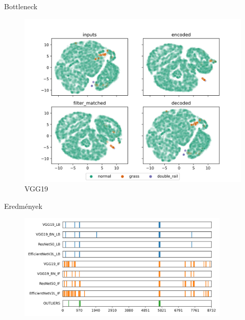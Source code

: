 \documentclass[aspectratio=169]{beamer}
\begin{document}
\begin{frame}{Bottleneck}
    \begin{figure}
        \centering
        \includegraphics[height=0.8\textheight,trim={0 0 0 1cm},clip]{./results/vgg19_vgg19/20230510_172958_feature_vectors_1.png}
        \caption*{VGG19}
    \end{figure}
\end{frame}

\begin{frame}{Eredmények}
    \begin{figure}
        \centering
        \includegraphics[width=0.9\textwidth]{./results/comparison/outlier_comparison.png}
    \end{figure}
\end{frame}
\end{document}
